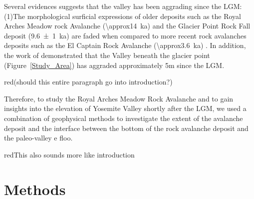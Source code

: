 \documentclass[5p]{elsarticle}
\newcommand{\alon}{\begin{color}{red}}
\newcommand{\aloff}{\end{color}}
\begin{document}
Several evidences suggests that the valley has been aggrading since the LGM: (1)The morphological surficial expressions of older deposits such as the Royal Arches Meadow rock Avalanche (\SI{\approx14}{\kilo a}) and the Glacier Point Rock Fall deposit (\SI{9.6 \pm 1}{\kilo a}) \citep{cordes2013supporting} are faded when compared to more recent rock avalanches deposits such as the El Captain Rock Avalanche (\SI{\approx3.6}{\kilo a}) \citep{stock2010catastrophic}. In addition, the work of \cite{cordes2013supporting} demonstrated that the Valley beneath the glacier point (Figure~\ref{Study_Area}) has aggraded approximately 5m since the LGM. \alon(should this entire paragraph go into introduction?)\aloff

Therefore, to study the Royal Arches Meadow Rock Avalanche and to gain insights into the elevation of Yosemite Valley shortly after the LGM, we used a combination of geophysical methods to investigate the extent of the avalanche deposit and the interface between the bottom of the rock avalanche deposit and the paleo-valley e floo. \alon This also sounds more like introduction \aloff



\section{Methods}

\end{document}
